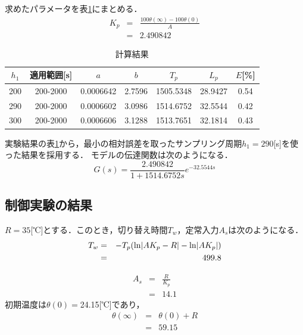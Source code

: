\documentclass[12pt]{jsarticle}
\begin{document}
求めたパラメータを表\ref{Experiment_ab}にまとめる．
\begin{eqnarray}
  \label{K_p}
  K_p &=& \frac{100 \theta(\infty)- 100 \theta(0)}{A} \\
      &=& 2.490842
\end{eqnarray}
\begin{table}[tb]
  \label{Experiment_ab}
  \caption{計算結果}
  \begin{tabular}{|c|c|c|c|c|c|c|} \hline
    $h_1$ & 適用範囲[s] & $a$ & $b$ & $T_p$ & $L_p$ & $E$[\%] \\ \hline \hline
    200 & 200-2000 & 0.0006642 & 2.7596 & 1505.5348 &  28.9427 & 0.54 \\ \hline
    290 & 200-2000 & 0.0006602 & 3.0986 & 1514.6752 &  32.5544 & 0.42 \\ \hline
    300 & 200-2000 & 0.0006606 & 3.1288 & 1513.7651 &  32.1814 & 0.43 \\ \hline
  \end{tabular}
\end{table}
実験結果の表\ref{Experiment_ab}から，最小の相対誤差を取ったサンプリング周期$h_1=290$[s]を使った結果を採用する．
モデルの伝達関数は次のようになる．
\begin{equation}
  \label{transform_result}
  G(s) = \frac{2.490842}{1+1514.6752s}e^{-32.5544s}
\end{equation}

\subsection{制御実験の結果}
$R=35$[℃]とする．このとき，切り替え時間$T_w$，定常入力$A_s$は次のようになる．
\begin{eqnarray}
  \label{T_w}
  T_w &=& -T_p ({\rm ln}|A K_p - R| - {\rm ln}| A K_p|) \\
      &=& 499.8
\end{eqnarray}

\begin{eqnarray}
  \label{A_s}
  A_s &=& \frac{R}{K_p} \\
      &=& 14.1
\end{eqnarray}
初期温度は$\theta(0)=$24.15[℃]であり，
\begin{eqnarray}
  \label{}
  \theta(\infty) &=& \theta(0) + R\\
  &=& 59.15
\end{eqnarray}
\end{document}
